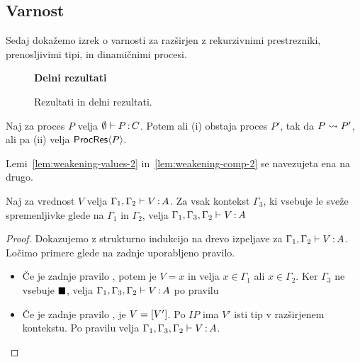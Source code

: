 \subsection{Varnost}

Sedaj dokažemo izrek o varnosti za \lae{} razširjen z rekurzivnimi prestrezniki, prenosljivimi tipi, in dinamičnimi procesi.


\begin{figure}[H]
	\centering
	
	\textbf{Delni rezultati}
	\begin{mathpar}
	\end{mathpar}
	

	\caption{Rezultati in delni rezultati.}
	\label{fig:results-rules}
\end{figure}


\begin{izrek}[o napredku]
	Naj za proces $P$ velja $\emptyset \types P \of C$. Potem ali (i) obstaja proces $P'$, tak da $P \reduces P'$, ali pa (ii) velja $\ProcResult{P}$.
\end{izrek}

Lemi~\ref{lem:weakening-values-2} in~\ref{lem:weakening-comp-2} se navezujeta ena na drugo.

\begin{lema}\label{lem:weakening-values-2}
	Naj za vrednost $V$ velja $\Gamma_1, \Gamma_2 \types V \of A$. Za vsak kontekst $\Gamma_3$, ki vsebuje le sveže spremenljivke glede na $\Gamma_1$ in $\Gamma_2$, velja $\Gamma_1, \Gamma_3, \Gamma_2 \types V \of A$
\end{lema}

\begin{proof}
	Dokazujemo z strukturno indukcijo na drevo izpeljave za $\Gamma_1, \Gamma_2 \types V \of A$.
	Ločimo primere glede na zadnje uporabljeno pravilo.
	
	\begin{itemize}
		\item Če je zadnje pravilo , potem je $V = x$ in velja $x \in \Gamma_1$ ali $x \in \Gamma_2$.
		Ker $\Gamma_3$ ne vsebuje $\bb$, velja $\Gamma_1, \Gamma_3, \Gamma_2 \types V \of A$ po pravilu 
		
		\item Če je zadnje pravilo , je $V = \tmboxed{V'}$. Po $IP$ ima $V'$ isti tip v razširjenem kontekstu.
		Po pravilu  velja $\Gamma_1, \Gamma_3, \Gamma_2 \types V \of A$.
		
	\end{itemize}
\end{proof}

